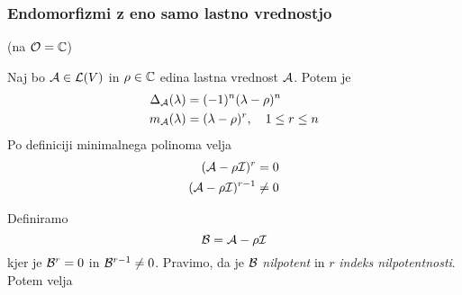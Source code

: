 \subsubsection{Endomorfizmi z eno samo lastno vrednostjo}
(na $\mathcal{O} = \mathbb{C}$)

Naj bo $\mathcal{A} \in \mathcal{L}(V)$ in $\rho \in \mathbb{C}$ edina lastna vrednost $\mathcal{A}$. Potem je
\begin{align*}
\Delta_{\mathcal{A}} (\lambda) &= (-1)^n (\lambda - \rho)^n \\
m_{\mathcal{A}} (\lambda) &= (\lambda - \rho)^r, \quad 1 \leq r \leq n
\end{align*}
Po definiciji minimalnega polinoma velja
\begin{align*}
(\mathcal{A} - \rho \mathcal{I})^r &= 0 \\
(\mathcal{A} - \rho \mathcal{I})^{r - 1} & \neq 0
\end{align*}

Definiramo
\begin{equation*}
\mathcal{B} = \mathcal{A}- \rho \mathcal{I}
\end{equation*}
kjer je $\mathcal{B}^r = 0$ in $\mathcal{B}^{r - 1} \neq 0$. Pravimo, da je $\mathcal{B}$ \emph{nilpotent} in $r$ \emph{indeks nilpotentnosti}. Potem velja

